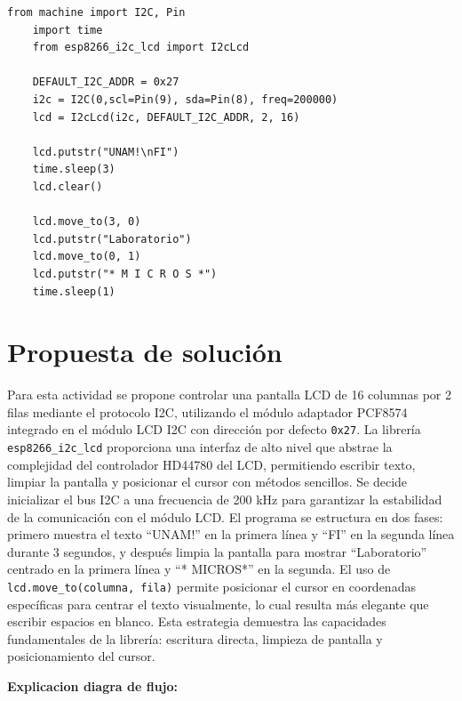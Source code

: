 \documentclass[letterpaper,12pt]{article}
\begin{document}
    \begin{lstlisting}[basicstyle=\ttfamily\footnotesize,caption={Figura 10-12. Código ejemplo; LCD I2C}]
    from machine import I2C, Pin
    import time
    from esp8266_i2c_lcd import I2cLcd

    DEFAULT_I2C_ADDR = 0x27
    i2c = I2C(0,scl=Pin(9), sda=Pin(8), freq=200000)
    lcd = I2cLcd(i2c, DEFAULT_I2C_ADDR, 2, 16)

    lcd.putstr("UNAM!\nFI")
    time.sleep(3)
    lcd.clear()

    lcd.move_to(3, 0)
    lcd.putstr("Laboratorio")
    lcd.move_to(0, 1)
    lcd.putstr("* M I C R O S *")
    time.sleep(1)
    \end{lstlisting}

    \section*{Propuesta de solución}

    Para esta actividad se propone controlar una pantalla LCD de 16 columnas por 2 filas mediante el protocolo I2C, utilizando el módulo adaptador PCF8574 integrado en el módulo LCD I2C con dirección por defecto \texttt{0x27}. La librería \texttt{esp8266\_i2c\_lcd} proporciona una interfaz de alto nivel que abstrae la complejidad del controlador HD44780 del LCD, permitiendo escribir texto, limpiar la pantalla y posicionar el cursor con métodos sencillos. Se decide inicializar el bus I2C a una frecuencia de 200 kHz para garantizar la estabilidad de la comunicación con el módulo LCD. El programa se estructura en dos fases: primero muestra el texto ``UNAM!'' en la primera línea y ``FI'' en la segunda línea durante 3 segundos, y después limpia la pantalla para mostrar ``Laboratorio'' centrado en la primera línea y ``* MICROS*'' en la segunda. El uso de \texttt{lcd.move\_to(columna, fila)} permite posicionar el cursor en coordenadas específicas para centrar el texto visualmente, lo cual resulta más elegante que escribir espacios en blanco. Esta estrategia demuestra las capacidades fundamentales de la librería: escritura directa, limpieza de pantalla y posicionamiento del cursor.

    \textbf{Explicacion diagra de flujo:}
\end{document}
